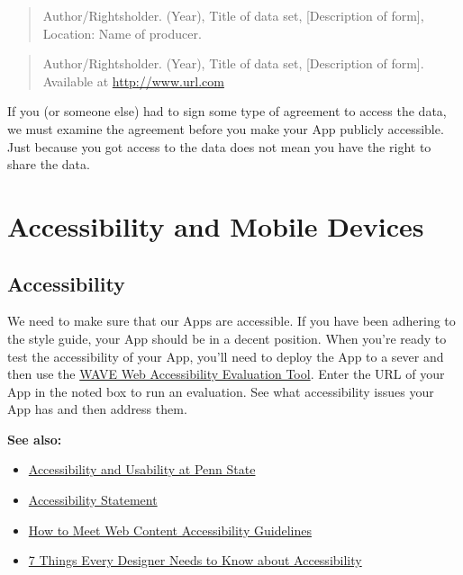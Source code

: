 \documentclass[
]{book}
\providecommand{\tightlist}{%
  \setlength{\itemsep}{0pt}\setlength{\parskip}{0pt}}
\begin{document}
\begin{quote}
Author/Rightsholder. (Year), Title of data set, {[}Description of form{]}, Location: Name of producer.
\end{quote}

\begin{quote}
Author/Rightsholder. (Year), Title of data set, {[}Description of form{]}. Available at \url{http://www.url.com}
\end{quote}

If you (or someone else) had to sign some type of agreement to access the data, we must examine the agreement before you make your App publicly accessible. Just because you got access to the data does not mean you have the right to share the data.

\hypertarget{part-accessibility-and-mobile-devices}{%
\part{Accessibility and Mobile Devices}\label{part-accessibility-and-mobile-devices}}

\hypertarget{accessibility}{%
\chapter{Accessibility}\label{accessibility}}

We need to make sure that our Apps are accessible. If you have been adhering to the style guide, your App should be in a decent position. When you're ready to test the accessibility of your App, you'll need to deploy the App to a sever and then use the \href{https://wave.webaim.org/}{WAVE Web Accessibility Evaluation Tool}. Enter the URL of your App in the noted box to run an evaluation. See what accessibility issues your App has and then address them.

\textbf{See also:}

\begin{itemize}
\tightlist
\item
  \href{https://accessibility.psu.edu/}{Accessibility and Usability at Penn State}
\item
  \href{https://www.psu.edu/accessibilitystatement}{Accessibility Statement}
\item
  \href{https://www.w3.org/WAI/WCAG21/quickref/}{How to Meet Web Content Accessibility Guidelines}
\item
  \href{https://medium.com/salesforce-ux/7-things-every-designer-needs-to-know-about-accessibility-64f105f0881b}{7 Things Every Designer Needs to Know about Accessibility}
\end{itemize}
\end{document}
